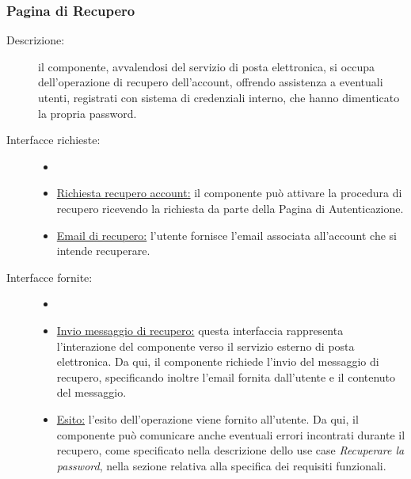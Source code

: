 \documentclass[11pt, a4paper]{article}
\theoremstyle{definition} %
\begin{document}
\subsubsection{Pagina di Recupero}
\begin{description}
    \item[Descrizione:] il componente, avvalendosi del servizio di posta
    elettronica, si occupa dell'operazione
    di recupero dell'account, offrendo assistenza a eventuali utenti,
    registrati con sistema di credenziali interno, che hanno dimenticato
    la propria password.

    \item[Interfacce richieste:]
    \begin{itemize}
        \item[]

        \item \underline{Richiesta recupero account:} il componente
        può attivare la procedura di recupero ricevendo la richiesta
        da parte della Pagina di Autenticazione.

        \item \underline{Email di recupero:} l'utente fornisce l'email
        associata all'account che si intende recuperare.

    \end{itemize}

    \item[Interfacce fornite:]
    \begin{itemize}
        \item[]

        \item \underline{Invio messaggio di recupero:} questa interfaccia
        rappresenta l'interazione del componente verso
        il servizio esterno di posta elettronica. Da qui, il
        componente richiede l'invio del messaggio di recupero,
        specificando inoltre l'email fornita dall'utente e il
        contenuto del messaggio.

        \item \underline{Esito:} l'esito dell'operazione viene
        fornito all'utente. Da qui, il componente può comunicare
        anche eventuali errori incontrati durante il recupero,
        come specificato nella descrizione dello use case
        \textit{Recuperare la password}, nella sezione relativa
        alla specifica dei requisiti funzionali.

    \end{itemize}
\end{description}
\end{document}
